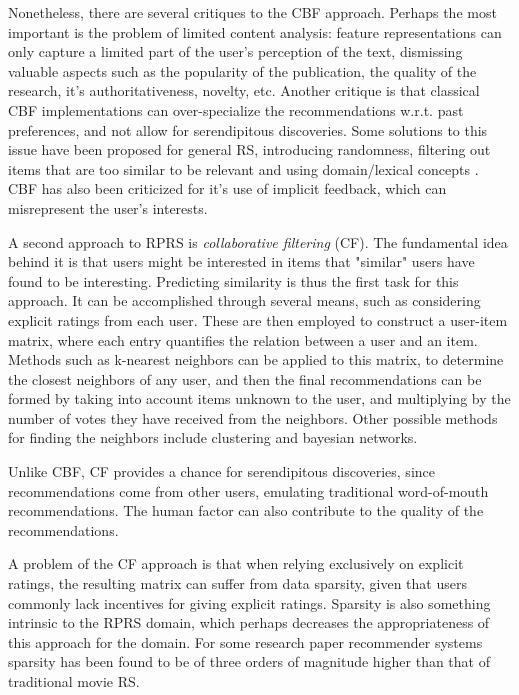 \documentclass{llncs}
\begin{document}
Nonetheless, there are several critiques to the CBF approach. Perhaps the most important is the problem of limited content analysis: feature representations can only capture a limited part of the user's perception of the text, dismissing valuable aspects such as the popularity of the publication, the quality of the research, it's authoritativeness, novelty, etc. Another critique is that classical CBF implementations can over-specialize the recommendations w.r.t. past preferences, and not allow for serendipitous discoveries. Some solutions to this issue have been proposed for general RS, introducing randomness\cite{sheth1993evolving}, filtering out items that are too similar to be relevant\cite{zhang2002novelty} and using domain/lexical concepts \cite{sugiyama2014comprehensive}\cite{iaquinta2008introducing}.
CBF has also been criticized for it's use of implicit feedback, which can misrepresent the user's interests\cite{balabanovic1997fab}.

A second approach to RPRS is \textit{collaborative filtering} (CF). The fundamental idea behind it is that users might be interested in items that "similar" users have found to be interesting. Predicting similarity is thus the first task for this approach. It can be accomplished through several means, such as considering explicit ratings from each user. These are then employed to construct a user-item matrix, where each entry quantifies the relation between a user and an item. Methods such as k-nearest neighbors can be applied to this matrix, to determine the closest neighbors of any user, and then the final recommendations can be formed by taking into account items unknown to the user, and multiplying by the number of votes they have received from the neighbors. Other possible methods for finding the neighbors include clustering and bayesian networks.

Unlike CBF, CF provides a chance for serendipitous discoveries, since recommendations come from other users, emulating traditional word-of-mouth recommendations. The human factor can also contribute to the quality of the recommendations.

A problem of the CF approach is that when relying exclusively on explicit ratings, the resulting matrix can suffer from data sparsity, given that users commonly lack incentives for giving explicit ratings. Sparsity is also something intrinsic to the RPRS domain, which perhaps decreases the appropriateness of this approach for the domain. For some research paper recommender systems sparsity has been found to be of three orders of magnitude higher than that of traditional movie RS\cite{vellino2013usage}. 
\end{document}
